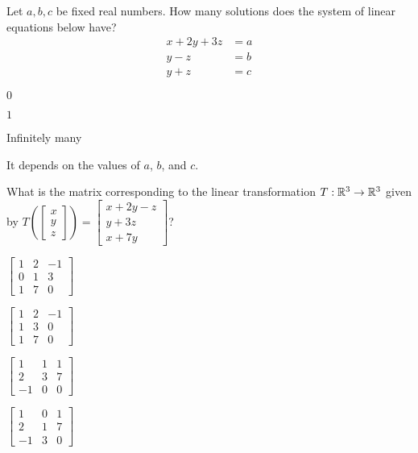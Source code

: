 \documentclass{article}
\begin{document}
\begin{readinessAssuranceTest}
\item Let $a, b, c$ be fixed real numbers.  How many solutions does the system of linear equations below have?
\begin{align*}
x+2y+3z &= a \\
y-z &= b \\
y+z &= c
\end{align*}

\begin{multicols}{4}
\begin{readinessAssuranceTestChoices}
\item $0$
\item $1$
\item Infinitely many
\item It depends on the values of $a$, $b$, and $c$.
\end{readinessAssuranceTestChoices}
\end{multicols}

\item What is the matrix corresponding to the linear transformation $T: \mathbb{R}^3 \rightarrow \mathbb{R}^3$ given by $T\left( \begin{bmatrix} x \\ y \\ z \end{bmatrix}\right) = \begin{bmatrix} x+2y-z \\ y+3z \\x+7y \end{bmatrix}$?
\begin{multicols}{4}
\begin{readinessAssuranceTestChoices}
\item $\begin{bmatrix} 1 & 2 & -1 \\ 0 & 1 & 3 \\ 1 & 7 & 0 \end{bmatrix}$
\item $\begin{bmatrix} 1 & 2 & -1 \\ 1 & 3 & 0 \\ 1 & 7 & 0 \end{bmatrix}$
\item $\begin{bmatrix} 1 & 1 & 1 \\ 2 & 3 & 7 \\ -1 & 0 & 0 \end{bmatrix}$
\item $\begin{bmatrix}  1 & 0 & 1 \\ 2 & 1 & 7 \\ -1 & 3 & 0 \end{bmatrix}$
\end{readinessAssuranceTestChoices}
\end{multicols}


\end{readinessAssuranceTest}
\end{document}
